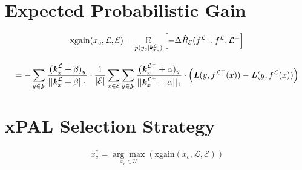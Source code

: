 \section{Expected Probabilistic Gain}

\begin{equation}
    \text{xgain}(x_c, \mathcal{L}, \mathcal{E}) = \underset{p(y_c|\textbf{\textit{k}}^{\mathcal{L}}_{x_c})}{\mathbb{E}} \left[ - \Delta \hat{R}_{\mathcal{E}} (f^{\mathcal{L}^+}, f^{\mathcal{L}}, \mathcal{L}^+ \right]
\end{equation}

\begin{equation}
    = - \sum_{y \in \mathcal{Y}}  \frac{\textbf{(\textit{k}}^{\mathcal{L}}_x + \beta)_y}{||\textbf{\textit{k}}^{\mathcal{L}}_x + \beta ||_1} \cdot \frac{1}{|\mathcal{E}|} \sum_{x \in \mathcal{E}} \sum_{y \in \mathcal{Y}}  \frac{\textbf{(\textit{k}}^{\mathcal{L}^+}_x + \alpha)_y}{||\textbf{\textit{k}}^{\mathcal{L}^+}_x + \alpha ||_1} \cdot \left( \textbf{\textit{L}} (y,f^{\mathcal{L}^+}(x)) - \textbf{\textit{L}}(y,f^{\mathcal{L}}(x)) \right)
\end{equation}

\section{xPAL Selection Strategy}

\begin{equation}
    x^*_c = \underset{x_c \in \mathcal{U}}{\arg \max} \left( \text{xgain} (x_c, \mathcal{L}, \mathcal{E}) \right)
\end{equation}